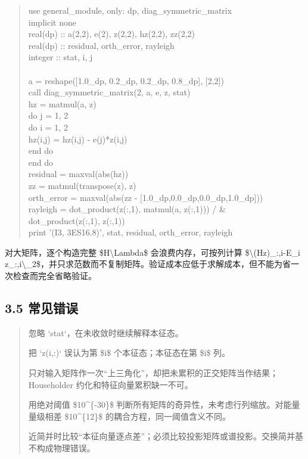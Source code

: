 \documentclass[UTF8,openany,11pt,fontset=fandol]{ctexbook}
\begin{document}
\begin{quote}
use general\_module, only: dp, diag\_symmetric\_matrix\\
implicit none\\
real(dp) :: a(2,2), e(2), z(2,2), hz(2,2), zz(2,2)\\
real(dp) :: residual, orth\_error, rayleigh\\
integer :: stat, i, j\\
~\\
a = reshape({[}1.0\_dp, 0.2\_dp, 0.2\_dp, 0.8\_dp{]}, {[}2,2{]})\\
call diag\_symmetric\_matrix(2, a, e, z, stat)\\
hz = matmul(a, z)\\
do j = 1, 2\\
do i = 1, 2\\
hz(i,j) = hz(i,j) - e(j)*z(i,j)\\
end do\\
end do\\
residual = maxval(abs(hz))\\
zz = matmul(transpose(z), z)\\
orth\_error = maxval(abs(zz - {[}1.0\_dp,0.0\_dp,0.0\_dp,1.0\_dp{]}))\\
rayleigh = dot\_product(z(:,1), matmul(a, z(:,1))) / \&\\
dot\_product(z(:,1), z(:,1))\\
print '(I3, 3ES16.8)', stat, residual, orth\_error, rayleigh
\end{quote}

对大矩阵，逐个构造完整 \$H\textbackslash Lambda\$ 会浪费内存，可按列计算
\$\textbackslash\textbar(Hz)\_:,i-E\_i
z\_:,i\textbackslash\textbar\_2\$，并只求范数而不复制矩阵。验证成本应低于求解成本，但不能为省一次检查而完全省略验证。

\subsection{\texorpdfstring{\textbf{3.5
常见错误}}{3.5 常见错误}}\label{ux5e38ux89c1ux9519ux8bef-2}

\begin{quote}
忽略 `stat`，在未收敛时继续解释本征态。

把 `z(i,:)` 误认为第 \$i\$ 个本征态；本征态在第 \$i\$ 列。

只对输入矩阵作一次``上三角化''，却把未累积的正交矩阵当作结果；Householder
约化和特征向量累积缺一不可。

用绝对阈值 \$10\^{}\{-30\}\$
判断所有矩阵的奇异性，未考虑行列缩放。对能量量级相差 \$10\^{}\{12\}\$
的耦合方程，同一阈值含义不同。

近简并时比较``本征向量逐点差''；必须比较投影矩阵或谱投影。交换简并基不构成物理错误。
\end{quote}
\end{document}
